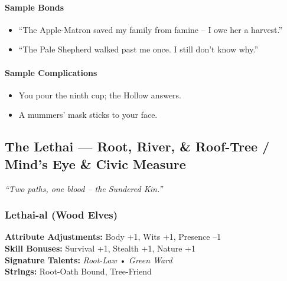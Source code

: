 \paragraph{Sample Bonds}
\begin{itemize}
  \item ``The Apple-Matron saved my family from famine -- I owe her a harvest.''
  \item ``The Pale Shepherd walked past me once. I still don't know why.''
\end{itemize}

\paragraph{Sample Complications}
\begin{itemize}
  \item You pour the ninth cup; the Hollow answers.
  \item A mummers' mask sticks to your face.
\end{itemize}

\clearpage

\subsection{The Lethai --- Root, River, \& Roof-Tree / Mind's Eye \& Civic Measure}
\label{sec:lethai-detailed}

\emph{``Two paths, one blood -- the Sundered Kin.''}

\subsubsection{Lethai-al (Wood Elves)}
\label{subsec:lethai-al-detailed}

\begin{tcolorbox}[colback=black!3!white,colframe=black!40!white,title=Wood Elf at a Glance,breakable]
\textbf{Attribute Adjustments:} Body +1, Wits +1, Presence --1 \\
\textbf{Skill Bonuses:} Survival +1, Stealth +1, Nature +1 \\
\textbf{Signature Talents:} \emph{Root-Law} • \emph{Green Ward} \\
\textbf{Strings:} Root-Oath Bound, Tree-Friend
\end{tcolorbox}

